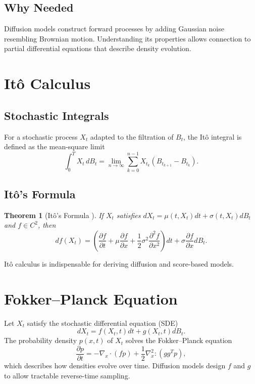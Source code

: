 \documentclass[11pt]{book}
\newtheorem{theorem}{Theorem}[chapter]
\begin{document}
\subsection{Why Needed}
Diffusion models construct forward processes by adding Gaussian noise resembling Brownian motion. Understanding its properties allows connection to partial differential equations that describe density evolution.

\section{Itô Calculus}
\subsection{Stochastic Integrals}
For a stochastic process $X_t$ adapted to the filtration of $B_t$, the Itô integral is defined as the mean-square limit
\begin{equation}
\int_0^T X_t \, dB_t = \lim_{n\to\infty} \sum_{k=0}^{n-1} X_{t_k} (B_{t_{k+1}}-B_{t_k}).
\end{equation}

\subsection{Itô's Formula}
\begin{theorem}[Itô's Formula \cite{ito1944}]
If $X_t$ satisfies $dX_t=\mu(t,X_t)dt+\sigma(t,X_t)dB_t$ and $f\in C^{2}$, then
\begin{equation}
df(X_t) = \left(\frac{\partial f}{\partial t}+\mu\frac{\partial f}{\partial x}+\frac{1}{2}\sigma^2\frac{\partial^2 f}{\partial x^2}\right)dt + \sigma\frac{\partial f}{\partial x} dB_t.
\end{equation}
\end{theorem}
Itô calculus is indispensable for deriving diffusion and score-based models.

\section{Fokker--Planck Equation}
Let $X_t$ satisfy the stochastic differential equation (SDE)
\begin{equation}
dX_t = f(X_t,t) dt + g(X_t,t) dB_t.
\end{equation}
The probability density $p(x,t)$ of $X_t$ solves the Fokker--Planck equation
\begin{equation}
\frac{\partial p}{\partial t} = -\nabla_x\cdot (f p) + \frac{1}{2}\nabla_x^2:(gg^T p),
\end{equation}
which describes how densities evolve over time. Diffusion models design $f$ and $g$ to allow tractable reverse-time sampling.
\end{document}
